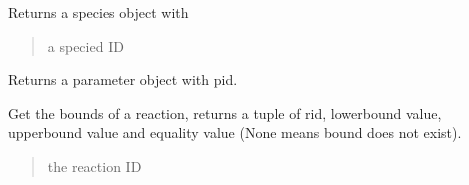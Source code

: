 \documentclass[letterpaper,12pt,english]{sphinxmanual}
\begin{document}
\begin{fulllineitems}
\begin{fulllineitems}
\begin{quote}
\begin{description}
\end{description}\end{quote}

\end{fulllineitems}


\begin{fulllineitems}
\label{\detokenize{api/core:cbmpy.CBModel.Model.getSpecies}}
\pysigstartsignatures
\pysiglinewithargsret
{}
{}
{}
\pysigstopsignatures
\sphinxAtStartPar
Returns a species object with 
\begin{quote}\begin{description}
\sphinxAtStartPar
{} \textendash{} a specied ID

\end{description}\end{quote}

\end{fulllineitems}


\begin{fulllineitems}
\label{\detokenize{api/core:cbmpy.CBModel.Model.getParameter}}
\pysigstartsignatures
\pysiglinewithargsret
{}
{}
{}
\pysigstopsignatures
\sphinxAtStartPar
Returns a parameter object with pid.

\end{fulllineitems}


\begin{fulllineitems}
\label{\detokenize{api/core:cbmpy.CBModel.Model.getReactionBounds}}
\pysigstartsignatures
\pysiglinewithargsret
{}
{}
{}
\pysigstopsignatures
\sphinxAtStartPar
Get the bounds of a reaction, returns a tuple of rid, lowerbound value, upperbound value and equality value (None means bound does not exist).
\begin{quote}\begin{description}
\sphinxAtStartPar
{} \textendash{} the reaction ID


\end{description}
\end{quote}
\end{fulllineitems}
\end{fulllineitems}
\end{document}
